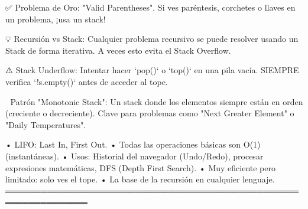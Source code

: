 \begin{dsaentrevistas}

✅ Problema de Oro: "Valid Parentheses". Si ves paréntesis, corchetes 
   o llaves en un problema, ¡usa un stack!

💡 Recursión vs Stack: Cualquier problema recursivo se puede resolver
   usando un Stack de forma iterativa. A veces esto evita el Stack 
   Overflow.

⚠️ Stack Underflow: Intentar hacer `pop()` o `top()` en una pila vacía.
   SIEMPRE verifica `!s.empty()` antes de acceder al tope.

🔑 Patrón "Monotonic Stack": Un stack donde los elementos siempre están
   en orden (creciente o decreciente). Clave para problemas como 
   "Next Greater Element" o "Daily Temperatures".

\end{dsaentrevistas}

\begin{dsaresumen}

• LIFO: Last In, First Out.
• Todas las operaciones básicas son O(1) (instantáneas).
• Usos: Historial del navegador (Undo/Redo), procesar expresiones
  matemáticas, DFS (Depth First Search).
• Muy eficiente pero limitado: solo ves el tope.
• La base de la recursión en cualquier lenguaje.
════════════════════════════════════════════════════════════════

\end{dsaresumen}


